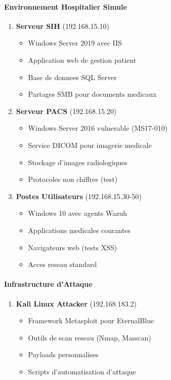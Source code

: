 \paragraph{Environnement Hospitalier Simule}
\begin{enumerate}
    \item \textbf{Serveur SIH} (192.168.15.10)
          \begin{itemize}
              \item Windows Server 2019 avec IIS
              \item Application web de gestion patient
              \item Base de donnees SQL Server
              \item Partages SMB pour documents medicaux
          \end{itemize}

    \item \textbf{Serveur PACS} (192.168.15.20)
          \begin{itemize}
              \item Windows Server 2016 vulnerable (MS17-010)
              \item Service DICOM pour imagerie medicale
              \item Stockage d'images radiologiques
              \item Protocoles non chiffres (test)
          \end{itemize}

    \item \textbf{Postes Utilisateurs} (192.168.15.30-50)
          \begin{itemize}
              \item Windows 10 avec agents Wazuh
              \item Applications medicales courantes
              \item Navigateurs web (tests XSS)
              \item Acces reseau standard
          \end{itemize}
\end{enumerate}

\paragraph{Infrastructure d'Attaque}
\begin{enumerate}
    \item \textbf{Kali Linux Attacker} (192.168.183.2)
          \begin{itemize}
              \item Framework Metasploit pour EternalBlue
              \item Outils de scan reseau (Nmap, Masscan)
              \item Payloads personnalises
              \item Scripts d'automatisation d'attaque
          \end{itemize}

\end{enumerate}

